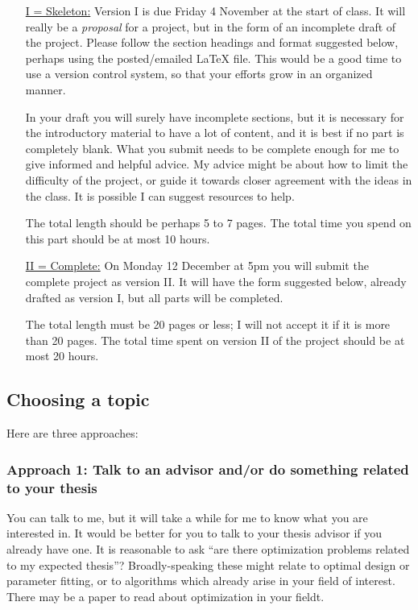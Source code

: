 \documentclass[12pt]{amsart}
\begin{document}
\medskip
\begin{itemize}
\item[\underline{I = Skeleton:}]  Version I is due Friday 4 November at the start of class.  It will really be a \emph{proposal} for a project, but in the form of an incomplete draft of the project.  Please follow the section headings and format suggested below, perhaps using the posted/emailed \LaTeX\xspace file.  This would be a good time to use a version control system, so that your efforts grow in an organized manner.

In your draft you will surely have incomplete sections, but it is necessary for the introductory material to have a lot of content, and it is best if no part is completely blank.  What you submit needs to be complete enough for me to give informed and helpful advice.  My advice might be about how to limit the difficulty of the project, or guide it towards closer agreement with the ideas in the class.  It is possible I can suggest resources to help.

The total length should be perhaps 5 to 7 pages.  The total time you spend on this part should be at most 10 hours.

\medskip
\item[\underline{II = Complete:}]  On Monday 12 December at 5pm you will submit the complete project as version II.  It will have the form suggested below, already drafted as version I, but all parts will be completed.

The total length must be 20 pages or less; I will not accept it if it is more than 20 pages.  The total time spent on version II of the project should be at most 20 hours.
\end{itemize}


\newpage
\subsection*{Choosing a topic}  Here are three approaches:

\subsubsection*{Approach 1: Talk to an advisor and/or do something related to your thesis}  You can talk to me, but it will take a while for me to know what you are interested in.  It would be better for you to talk to your thesis advisor if you already have one.  It is reasonable to ask ``are there optimization problems related to my expected thesis''?  Broadly-speaking these might relate to optimal design or parameter fitting, or to algorithms which already arise in your field of interest.  There may be a paper to read about optimization in your fieldt.
\end{document}
